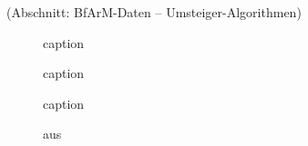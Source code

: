 



(Abschnitt: BfArM-Daten -- Umsteiger-Algorithmen)

\begin{figure}[H]
    \centering\large%
    \resizebox{.99\textwidth}{!}{}
    \normalsize\caption{caption}
\end{figure}

\newpage

\begin{figure}[H]
    \centering\large%
    \resizebox{.99\textwidth}{!}{}
    \normalsize\caption{caption}
\end{figure}

\begin{figure}[H]
    \centering\large%
    \resizebox{.99\textwidth}{!}{}
    \normalsize\caption{caption}
\end{figure}

\newpage

\begin{figure}[H]
    \centering
    \setlength{\fboxsep}{10pt}\color{black!20}
    \normalcolor\caption{aus \citep[Seite 172]{gross2013handbook}}
\end{figure}

